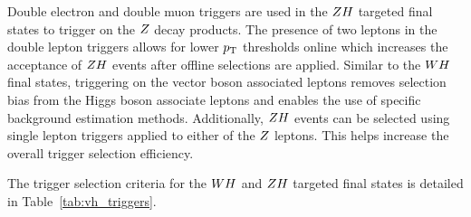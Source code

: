 Double electron and double muon triggers are used in 
the $ZH$ targeted final states to trigger on the $Z$ decay products.
The presence of two leptons in the double lepton
triggers allows for lower $p_\mathrm{T}$ thresholds online which increases
the acceptance of $ZH$ events after offline selections are applied. 
Similar to the $WH$ final states, triggering on the vector boson associated
leptons removes selection bias from the
Higgs boson associate leptons and enables the use of specific background
estimation methods. Additionally, $ZH$ events can be selected using
single lepton triggers applied to either of the $Z$ leptons. 
This helps increase the overall trigger selection efficiency.

The trigger selection criteria for the $WH$ and $ZH$ targeted final 
states is detailed in Table~\ref{tab:vh_triggers}.


